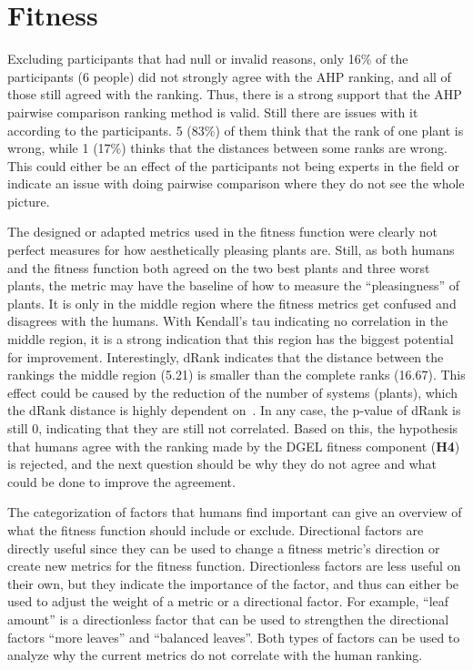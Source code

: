 
\section{Fitness}
Excluding participants that had null or invalid reasons, only 16\% of the participants (6 people) did not strongly agree with the \gls{AHP} ranking, and all of those still agreed with the ranking.
Thus, there is a strong support that the \gls{AHP} pairwise comparison ranking method is valid.
Still there are issues with it according to the participants.
5 (83\%) of them think that the rank of one plant is wrong, while 1 (17\%) thinks that the distances between some ranks are wrong.
This could either be an effect of the participants not being experts in the field or indicate an issue with doing pairwise comparison where they do not see the whole picture.

The designed or adapted metrics used in the fitness function were clearly not perfect measures for how aesthetically pleasing plants are.
Still, as both humans and the fitness function both agreed on the two best plants and three worst plants, the metric may have the baseline of how to measure the ``pleasingness'' of plants.
It is only in the middle region where the fitness metrics get confused and disagrees with the humans.
With Kendall's tau indicating no correlation in the middle region, it is a strong indication that this region has the biggest potential for improvement.
Interestingly, dRank indicates that the distance between the rankings the middle region (5.21) is smaller than the complete ranks (16.67). %
This effect could be caused by the reduction of the number of systems (plants), which the dRank distance is highly dependent on~\cite{2009Carterette}.
In any case, the p-value of dRank is still 0, indicating that they are still not correlated.
Based on this, the hypothesis that humans agree with the ranking made by the \gls{DGEL} fitness component (\textbf{H4}) is rejected, and the next question should be why they do not agree and what could be done to improve the agreement.

The categorization of factors that humans find important can give an overview of what the fitness function should include or exclude.
Directional factors are directly useful since they can be used to change a fitness metric's direction or create new metrics for the fitness function.
Directionless factors are less useful on their own, but they indicate the importance of the factor, and thus can either be used to adjust the weight of a metric or a directional factor.
For example, ``leaf amount'' is a directionless factor that can be used to strengthen the directional factors ``more leaves'' and ``balanced leaves''.
Both types of factors can be used to analyze why the current metrics do not correlate with the human ranking.

